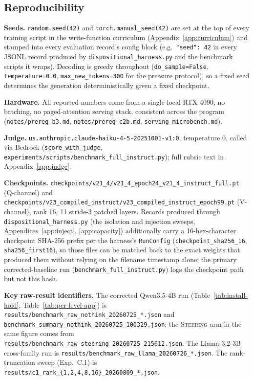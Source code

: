 \subsection{Reproducibility}
\label{app:repro}

\textbf{Seeds.} \texttt{random.seed(42)} and \texttt{torch.manual\_seed(42)} are set at
the top of every training script in the write-function curriculum
(Appendix~\ref{app:curriculum}) and stamped into every evaluation record's config block
(e.g.\ \texttt{"seed": 42} in every JSONL record produced by
\texttt{dispositional\_harness.py} and the benchmark scripts it wraps). Decoding is
greedy throughout (\texttt{do\_sample=False}, \texttt{temperature=0.0},
\texttt{max\_new\_tokens=300} for the pressure protocol), so a fixed seed determines the
generation deterministically given a fixed checkpoint.

\textbf{Hardware.} All reported numbers come from a single local RTX 4090, no batching,
no paged-attention serving stack, consistent across the program
(\texttt{notes/prereg\_b3.md}, \texttt{notes/prereg\_c2b.md},
\texttt{serving\_microbench.md}).

\textbf{Judge.} \texttt{us.anthropic.claude-haiku-4-5-20251001-v1:0}, temperature 0,
called via Bedrock (\texttt{score\_with\_judge},
\texttt{experiments/scripts/benchmark\_full\_instruct.py}); full rubric text in
Appendix~\ref{app:judge}.

\textbf{Checkpoints.} \texttt{checkpoints/v21\_4/v21\_4\_epoch24\_v21\_4\_instruct\_full.pt}
(Q-channel) and \texttt{checkpoints/v23\_compiled\_instruct/v23\_compiled\_instruct\_epoch99.pt}
(V-channel), rank 16, 11 stride-3 patched layers. Records produced through
\texttt{dispositional\_harness.py} (the isolation and injection sweeps,
Appendices~\ref{app:inject}, \ref{app:capacity}) additionally carry a 16-hex-character
checkpoint SHA-256 prefix per the harness's \texttt{RunConfig}
(\texttt{checkpoint\_sha256\_16}, \texttt{sha256\_first16}), so those files can be matched
back to the exact weights that produced them without relying on the filename timestamp
alone; the primary corrected-baseline run (\texttt{benchmark\_full\_instruct.py}) logs the
checkpoint path but not this hash.

\textbf{Key raw-result identifiers.} The corrected Qwen3.5-4B run (Table~\ref{tab:install-hold},
Table~\ref{tab:per-level-app}) is \texttt{results/benchmark\_raw\_nothink\_20260725\_*.json}
and \texttt{benchmark\_summary\_nothink\_20260725\_100329.json}; the \textsc{Steering}
arm in the same figure comes from \texttt{results/benchmark\_raw\_steering\_20260725\_215612.json}.
The Llama-3.2-3B cross-family run is \texttt{results/benchmark\_raw\_llama\_20260726\_*.json}.
The rank-truncation sweep (Exp.~C.1) is \texttt{results/c1\_rank\_\{1,2,4,8,16\}\_20260809\_*.json}.

